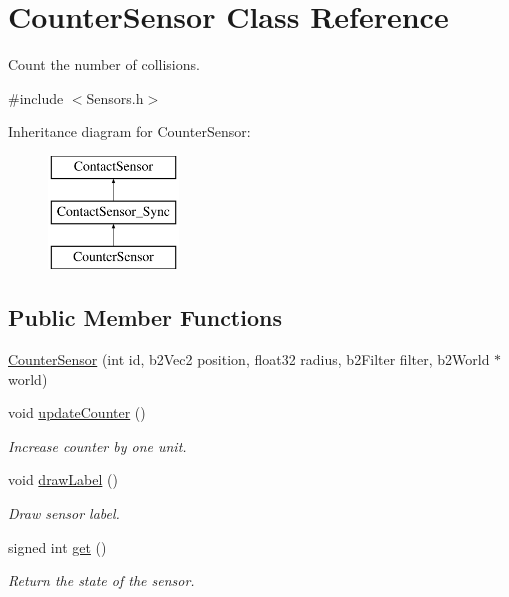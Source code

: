 \hypertarget{classCounterSensor}{\section{Counter\-Sensor Class Reference}
\label{classCounterSensor}
}


Count the number of collisions.  




{\ttfamily \#include $<$Sensors.\-h$>$}

Inheritance diagram for Counter\-Sensor\-:\begin{figure}[H]
\begin{center}
\leavevmode
\includegraphics[height=3.000000cm]{classCounterSensor}
\end{center}
\end{figure}
\subsection*{Public Member Functions}
\begin{DoxyCompactItemize}
\item 
\hyperlink{classCounterSensor_a0a7194fc72b5b35feba9ffe7da90d108}{Counter\-Sensor} (int id, b2\-Vec2 position, float32 radius, b2\-Filter filter, b2\-World $\ast$world)
\item 
void \hyperlink{classCounterSensor_a1763f5725f88b507e8c03149d236ad1f}{update\-Counter} ()
\begin{DoxyCompactList}\small\item\em Increase counter by one unit. \end{DoxyCompactList}\item 
void \hyperlink{classCounterSensor_a43e99153ba1e398d66bdc1b1f5bc349d}{draw\-Label} ()
\begin{DoxyCompactList}\small\item\em Draw sensor label. \end{DoxyCompactList}\item 
signed int \hyperlink{classCounterSensor_aec52d1f6a0e52eaa61d356d9f15b665a}{get} ()
\begin{DoxyCompactList}\small\item\em Return the state of the sensor. \end{DoxyCompactList}\end{DoxyCompactItemize}
